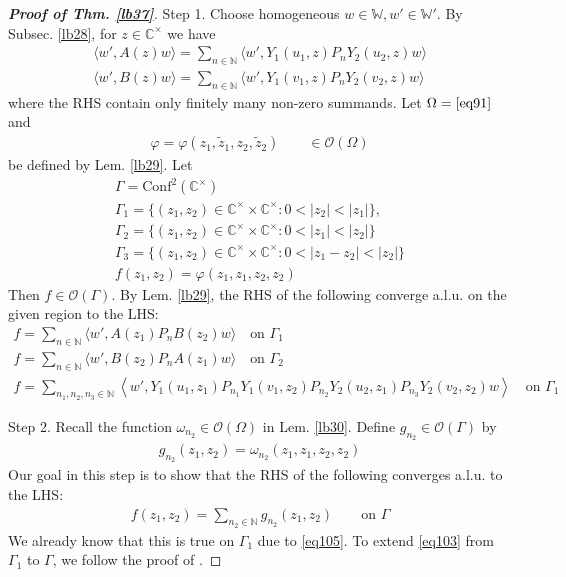 \documentclass[11pt,b5paper,notitlepage]{article}
\theoremstyle{definition}
\theoremstyle{plain}
\newcommand{\mc}{\mathcal}
\newcommand{\wtd}{\widetilde}
\newcommand{\Conf}{\mathrm{Conf}}
\newcommand{\Wbb}{\mathbb W}
\newcommand{\Cbb}{\mathbb C}
\newcommand{\Nbb}{\mathbb N}
\newcommand{\<}{\left\langle}
\renewcommand{\>}{\right\rangle}
\newcommand{\bigbk}[1]{\big\langle {#1}\big\rangle}
\numberwithin{equation}{section}
\begin{document}
\begin{proof}[\textbf{Proof of Thm. \ref{lb37}}]
Step 1. Choose homogeneous $w\in\Wbb,w'\in\Wbb'$. By Subsec. \ref{lb28}, for $z\in\Cbb^\times$ we have
\begin{gather*}
\bigbk{w',A(z)w}=\sum_{n\in\Nbb}\bigbk{w',Y_1(u_1,z)P_nY_2(u_2,z)w}\\
\bigbk{w',B(z)w}=\sum_{n\in\Nbb}\bigbk{w',Y_1(v_1,z)P_nY_2(v_2,z)w}
\end{gather*}
where the RHS contain only finitely many non-zero summands.  Let $\Omega=\eqref{eq91}$ and
\begin{align*}
\varphi=\varphi(z_1,\wtd z_1,z_2,\wtd z_2)\qquad\in\mc O(\Omega)
\end{align*}
be defined by Lem. \ref{lb29}. Let
\begin{gather*}
\Gamma=\Conf^2(\Cbb^\times)\\
\Gamma_1=\{(z_1,z_2)\in \Cbb^\times \times \Cbb^\times :0<\vert z_2\vert <\vert z_1\vert\},\\
\Gamma_2=\{(z_1,z_2)\in \Cbb^\times \times \Cbb^\times :0<\vert z_1\vert <\vert z_2\vert\}\\
\Gamma_3=\{(z_1,z_2)\in\Cbb^\times\times\Cbb^\times:0<|z_1-z_2|<|z_2|\}\\
f(z_1,z_2)=\varphi(z_1,z_1,z_2,z_2)
\end{gather*}
Then $f\in\mc O(\Gamma)$. By Lem. \ref{lb29}, the RHS of the following converge a.l.u. on the given region to the LHS:
\begin{subequations}
\begin{gather}
f=\sum_{n\in\Nbb}\bigbk{w',A(z_1)P_n B(z_2)w}\quad \text{on }\Gamma_1 \label{eq107}\\
f=\sum_{n\in\Nbb}\bigbk{w',B(z_2)P_n A(z_1)w}\quad \text{on }\Gamma_2 \label{eq108}\\
f=\sum_{n_1,n_2,n_3\in\Nbb}\<w',Y_1(u_1,z_1)P_{n_1}Y_1(v_1,z_2)
P_{n_2}Y_2(u_2,z_1)P_{n_3}Y_2(v_2,z_2)w\>\quad\text{on }\Gamma_1  \label{eq105}
\end{gather}
\end{subequations}


Step 2. Recall the function $\omega_{n_2}\in\mc O(\Omega)$ in Lem. \ref{lb30}. Define $g_{n_2}\in\mc O(\Gamma)$ by
\begin{align*}
g_{n_2}(z_1,z_2)=\omega_{n_2}(z_1,z_1,z_2,z_2)
\end{align*} 
Our goal in this step is to show that the RHS of the following converges a.l.u. to the LHS:
\begin{align}
f(z_1,z_2)=\sum_{n_2\in\Nbb} g_{n_2}(z_1,z_2)\qquad\text{on }\Gamma \label{eq103}
\end{align}
We already know that this is true on $\Gamma_1$ due to \eqref{eq105}. To extend \eqref{eq103} from $\Gamma_1$ to $\Gamma$, we follow the proof of \cite[Thm. 8.4]{GuiLec}.




\end{proof}
\end{document}
